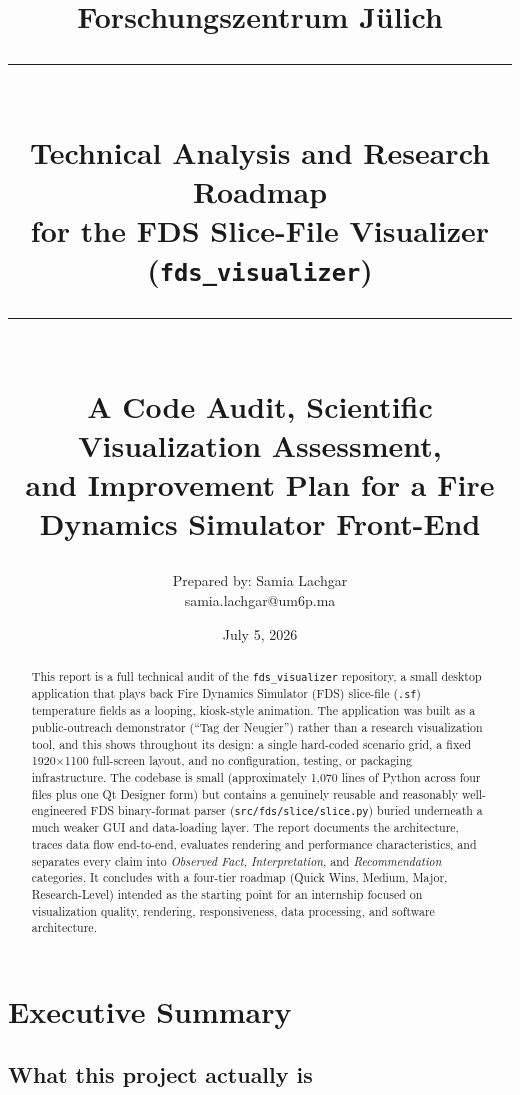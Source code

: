 \documentclass[11pt,a4paper]{report}
\title{
  \vspace{-2cm}
  {\Large Forschungszentrum J\"ulich}\\[0.3cm]
  \rule{\linewidth}{0.5pt}\\[0.4cm]
  {\huge\bfseries Technical Analysis and Research Roadmap\\[0.3cm]
  for the FDS Slice-File Visualizer (\texttt{fds\_visualizer})}\\[0.4cm]
  \rule{\linewidth}{0.5pt}\\[0.5cm]
  {\large A Code Audit, Scientific Visualization Assessment,\\
  and Improvement Plan for a Fire Dynamics Simulator Front-End}
}
\author{Prepared by: Samia Lachgar \\ \small samia.lachgar@um6p.ma}
\date{July 5, 2026}
\begin{document}
\maketitle
\thispagestyle{empty}

\begin{abstract}
\noindent
This report is a full technical audit of the \texttt{fds\_visualizer} repository, a small desktop application
that plays back Fire Dynamics Simulator (FDS) slice-file (\texttt{.sf}) temperature fields as a looping,
kiosk-style animation. The application was built as a public-outreach demonstrator (``Tag der Neugier'')
rather than a research visualization tool, and this shows throughout its design: a single hard-coded
scenario grid, a fixed 1920$\times$1100 full-screen layout, and no configuration, testing, or packaging
infrastructure. The codebase is small (approximately 1{,}070 lines of Python across four files plus one
Qt Designer form) but contains a genuinely reusable and reasonably well-engineered FDS binary-format
parser (\texttt{src/fds/slice/slice.py}) buried underneath a much weaker GUI and data-loading layer. The
report documents the architecture, traces data flow end-to-end, evaluates rendering and performance
characteristics, and separates every claim into \emph{Observed Fact}, \emph{Interpretation}, and
\emph{Recommendation} categories. It concludes with a four-tier roadmap (Quick Wins, Medium, Major,
Research-Level) intended as the starting point for an internship focused on visualization quality,
rendering, responsiveness, data processing, and software architecture.
\end{abstract}

\tableofcontents
\listoffigures
\listoftables

\chapter{Executive Summary}

\section{What this project actually is}
\end{document}
